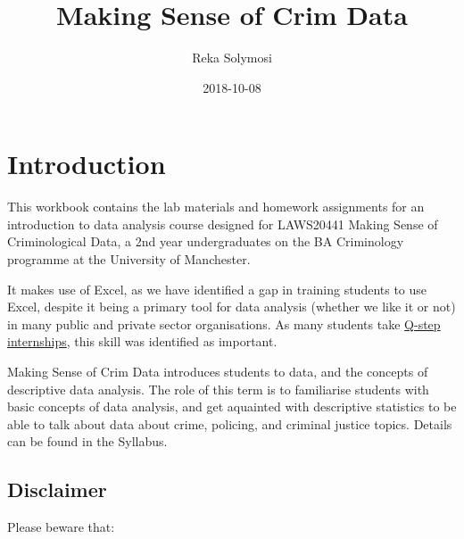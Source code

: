 \documentclass[]{book}
\title{Making Sense of Crim Data}
\author{Reka Solymosi}
\date{2018-10-08}
\theoremstyle{definition}
\theoremstyle{definition}
\theoremstyle{definition}
\theoremstyle{remark}
\begin{document}
\maketitle

{
\setcounter{tocdepth}{1}
\tableofcontents
}
\hypertarget{introduction}{%
\chapter*{Introduction}\label{introduction}}

This workbook contains the lab materials and homework assignments for an
introduction to data analysis course designed for LAWS20441 Making Sense
of Criminological Data, a 2nd year undergraduates on the BA Criminology
programme at the University of Manchester.

It makes use of Excel, as we have identified a gap in training students
to use Excel, despite it being a primary tool for data analysis (whether
we like it or not) in many public and private sector organisations. As
many students take
\href{https://www.humanities.manchester.ac.uk/q-step/}{Q-step
internships}, this skill was identified as important.

Making Sense of Crim Data introduces students to data, and the concepts
of descriptive data analysis. The role of this term is to familiarise
students with basic concepts of data analysis, and get aquainted with
descriptive statistics to be able to talk about data about crime,
policing, and criminal justice topics. Details can be found in the
Syllabus.

\hypertarget{disclaimer}{%
\section{Disclaimer}\label{disclaimer}}

Please beware that:
\end{document}
